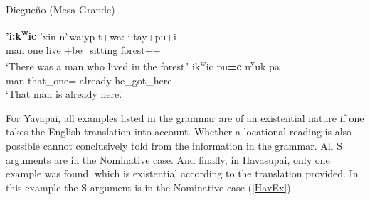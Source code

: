 
\begin{exe}\ex\label{DieExLoc} {Diegue\~no (Mesa Grande)} \citetext{Yuman; California; \citealt[27]{Gorbet:1976}, \citealt[176]{Langdon:1970}}\nopagebreak[4] 
\begin{xlist} 
\ex\gll \textbf{'i:k\textsuperscript{w}ic} 'xin n\textsuperscript{y}wa:yp t+wa: i:tay+pu+i\\
man one live \prog{}+be\_sitting forest+\dem{}+\loc{}\\
\glt `There was a man who lived in the forest.'
\ex\gll \textglotstop ik\textsuperscript{w}ic pu\textbf{=c} n\textsuperscript{y}uk pa\\
man that\_one=\nom{} already he\_got\_here\\
\glt `That man is already here.'
\end{xlist}
\end{exe}

For Yavapai, all examples listed in the grammar are of an existential nature if one takes the English translation into account. 
 Whether a locational reading is also possible cannot conclusively told from the information in the grammar. 
All S arguments are in the Nominative case. 
And finally, in Havasupai, only one example was found, which is existential according to the translation provided. 
In this example the S argument is in the Nominative case (\ref{HavEx}).

